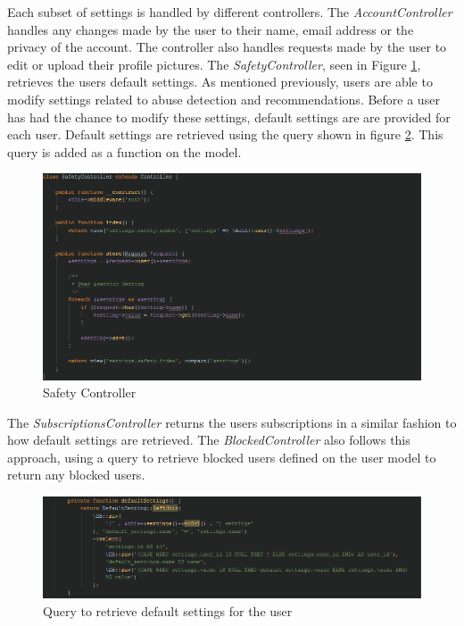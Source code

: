 Each subset of settings is handled by different controllers. The \textit{AccountController} handles any changes made by the user to their name, email address or the privacy of the account. The controller also handles requests made by the user to edit or upload their profile pictures. The \textit{SafetyController}, seen in Figure \ref{fig:SafetyController}, retrieves the users default settings. As mentioned previously, users are able to modify settings related to abuse detection and recommendations. Before a user has had the chance to modify these settings, default settings are are provided for each user. Default settings are retrieved using the query shown in figure \ref{fig:UserDefaultSettings}. This query is added as a function on the model.

\begin{figure}[H]
\centering
\includegraphics[width=\textwidth]{Images/Implementation/SafetyController}
\caption{Safety Controller}
\label{fig:SafetyController}
\end{figure}

The \textit{SubscriptionsController} returns the users subscriptions in a similar fashion to how default settings are retrieved. The \textit{BlockedController} also follows this approach, using a query to retrieve blocked users defined on the user model to return any blocked users.

\begin{figure}[H]
\centering
\includegraphics[width=\textwidth]{Images/Implementation/UserDefaultSettings}
\caption{Query to retrieve default settings for the user}
\label{fig:UserDefaultSettings}
\end{figure}

